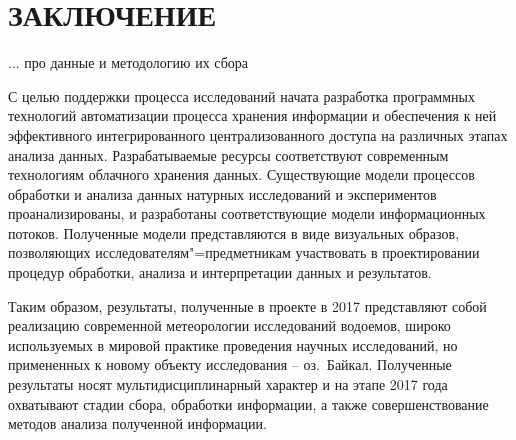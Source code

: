 \documentclass[a4paper,12pt,openany,final]{extreport}
\newcommand\theyear{2017}
\begin{document}
\chapter*{ЗАКЛЮЧЕНИЕ}
\label{chap:concl}


... про данные и методологию их сбора

С целью поддержки процесса исследований начата разработка программных технологий автоматизации процесса хранения информации и обеспечения к ней эффективного интегрированного централизованного доступа на различных этапах анализа данных.  Разрабатываемые ресурсы соответствуют современным технологиям облачного хранения данных.  Существующие модели процессов обработки и анализа данных натурных исследований и экспериментов проанализированы, и разработаны соответствующие модели информационных потоков.  Полученные модели представляются в виде визуальных образов, позволяющих исследователям"=предметникам участвовать в проектировании процедур обработки, анализа и интерпретации данных и результатов.

Таким образом, результаты, полученные в проекте в \theyear{} представляют собой реализацию современной метеорологии исследований водоемов, широко используемых в мировой практике проведения научных исследований, но примененных к новому объекту исследования -- оз.~Байкал.  Полученные результаты носят мультидисциплинарный характер и на этапе \theyear{} года охватывают стадии сбора, обработки информации, а также совершенствование методов анализа полученной информации.

\appendices
\end{document}
